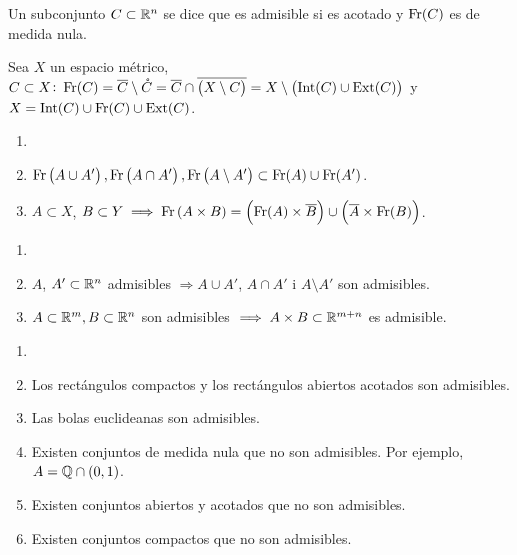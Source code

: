  \begin{defi}
    Un subconjunto $C \subset \mathbb{R}^n$ se dice que es admisible si es acotado y $\operatorname{Fr}(C)$ es de medida nula.
 \end{defi}
 \begin{obs}
    Sea $X$ un espacio métrico, $C \subset X \colon \operatorname{Fr}(C) = \overline{C} \setminus \mathring{C} = \overline{C} \cap \overline{\left( X \setminus C \right)} = X \setminus \left( \operatorname{Int}(C) \cup \operatorname{Ext}(C) \right)$ y $X = \operatorname{Int}(C) \cup \operatorname{Fr}(C) \cup \operatorname{Ext}(C)$.
 \end{obs}
 \begin{lema}
    \begin{enumerate}[(1)]
        \item[]
        \item $\operatorname{Fr} \left( A\cup A' \right), \operatorname{Fr} \left( A\cap A' \right), \operatorname{Fr} \left( A\setminus A' \right) \subset \operatorname{Fr}(A)\cup\operatorname{Fr}(A')$.
        \item $A \subset X$, $B \subset Y \implies \operatorname{Fr} \left( A \times B\right) = \left( \operatorname{Fr}(A)\times \overline{B} \right) \cup \left( \overline{A} \times \operatorname{Fr}(B) \right)$.
    \end{enumerate}
\end{lema}
\begin{col}
    \begin{enumerate}[(1)]
        \item[]
        \item $A$, $A' \subset \mathbb{R}^n$ admisibles $\Longrightarrow A\cup A'$, $A\cap A'$ i $A\setminus A'$ son admisibles.
        \item $A \subset \mathbb{R}^m, B \subset \mathbb{R}^n$ son admisibles $\implies A\times B \subset \mathbb{R}^{m+n}$ es admisible.
    \end{enumerate}
\end{col}

\begin{example}
    \begin{enumerate}[(1)] \item[]
        \item Los rectángulos compactos y los rectángulos abiertos acotados son admisibles.
        \item Las bolas euclideanas son admisibles.
        \item Existen conjuntos de medida nula que no son admisibles. Por ejemplo, $A=\mathbb{Q} \cap \left( 0, 1 \right)$.
        \item Existen conjuntos abiertos y acotados que no son admisibles.
        \item Existen conjuntos compactos que no son admisibles.
    \end{enumerate}
\end{example}

